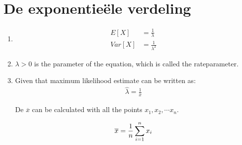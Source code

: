 \documentclass[a4paper,12px]{article}
\begin{document}


\section{}
\section{}
\section{De exponentie\"ele verdeling}

\begin{enumerate}
    \item
        \begin{equation}
        \begin{aligned}
            E[X] &= \frac{1}{\lambda}\\
            Var[X] &= \frac{1}{\lambda^2}
        \end{aligned}
        \end{equation}

    \item $\lambda > 0$ is the parameter of the equation, which is called the
        rateparameter.

    \item Given that maximum likelihood estimate can be written as:
        \begin{equation}
        \begin{aligned}
            \widehat{\lambda} = \frac{1}{\overline{x}}
        \end{aligned}
        \end{equation}

        De $\overline{x}$ can be calculated with all the points $x_1, x_2,
        \cdots x_n$.

        \begin{equation}
        \begin{aligned}
            \overline{x}={1 \over n}\sum_{i=1}^n x_i
        \end{aligned}
        \end{equation}


\end{enumerate}
\end{document}
